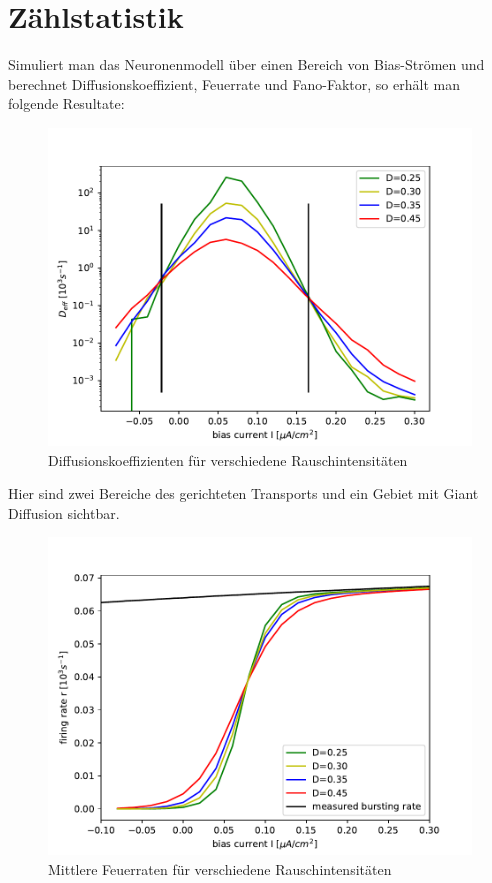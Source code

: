 \documentclass[12pt,a4paper]{article}
\begin{document}
\section{Zählstatistik}
Simuliert man das Neuronenmodell über einen Bereich von Bias-Strömen und berechnet Diffusionskoeffizient, Feuerrate und Fano-Faktor, so erhält man folgende Resultate:
\begin{figure}[H]
	\centering
	\includegraphics[scale=0.5]{deff.pdf}\caption{Diffusionskoeffizienten für verschiedene Rauschintensitäten}
	\label{deff}
\end{figure}
Hier sind zwei Bereiche des gerichteten Transports und ein Gebiet mit Giant Diffusion sichtbar.
\begin{figure}[H]
	\centering
	\includegraphics[scale=0.5]{firingrate.pdf}\caption{Mittlere Feuerraten für verschiedene Rauschintensitäten}
	\label{firate}
\end{figure}
\end{document}
